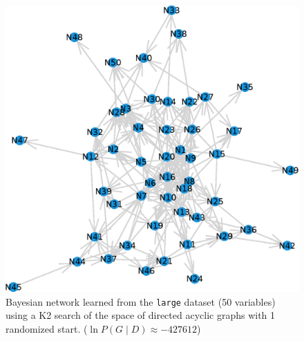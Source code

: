 \documentclass[10pt,letterpaper]{article}
\begin{document}
	\begin{figure}[h!] %
		\centering
		\includegraphics[width=0.9\linewidth]{figs/large-K2-1}
		\setlength{\belowcaptionskip}{-10pt}
		\caption{Bayesian network learned from the \texttt{large} dataset (50 variables) using a K2 search of the space of directed acyclic graphs with 1 randomized start. ($\ln P(G\mid D) \approx - 427612$)}
		\label{fig:large_graph}
	\end{figure}

				
	
	
	
\end{document}
